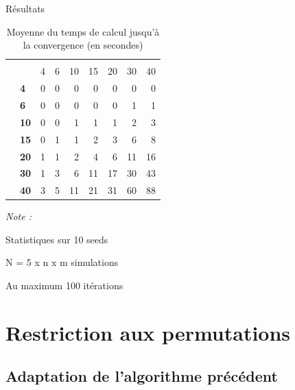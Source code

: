 \documentclass[10pt,xcolor=table,color={dvipsnames,usenames},ignorenonframetext,usepdftitle=false,french]{beamer}
\begin{document}
\begin{frame}{Résultats}
\protect\hypertarget{ruxe9sultats-4}{}

\begin{table}

\caption{\label{tab:tabq1tempsconv}Moyenne du temps de calcul jusqu'à la convergence (en secondes)}
\centering
\begin{threeparttable}
\begin{tabular}[t]{>{\bfseries}l|>{\bfseries}l|r|r|r|r|r|r|r}
\hline
\multicolumn{2}{c|}{ } & \multicolumn{7}{c}{m} \\
\cline{3-9}
  &    & 4 & 6 & 10 & 15 & 20 & 30 & 40\\
\hline
 & 4 & 0 & 0 & 0 & 0 & 0 & 0 & 0\\
\cline{2-9}
 & 6 & 0 & 0 & 0 & 0 & 0 & 1 & 1\\
\cline{2-9}
 & 10 & 0 & 0 & 1 & 1 & 1 & 2 & 3\\
\cline{2-9}
 & 15 & 0 & 1 & 1 & 2 & 3 & 6 & 8\\
\cline{2-9}
 & 20 & 1 & 1 & 2 & 4 & 6 & 11 & 16\\
\cline{2-9}
 & 30 & 1 & 3 & 6 & 11 & 17 & 30 & 43\\
\cline{2-9}
\multirow{-7}{*}{\raggedright\arraybackslash n} & 40 & 3 & 5 & 11 & 21 & 31 & 60 & 88\\
\hline
\end{tabular}
\begin{tablenotes}
\item \textit{Note : } 
\item Statistiques sur 10 seeds
\item N = 5 x n x m simulations
\item Au maximum 100 itérations
\end{tablenotes}
\end{threeparttable}
\end{table}

\end{frame}

\hypertarget{restriction-aux-permutations}{%
\section{Restriction aux
permutations}\label{restriction-aux-permutations}}

\hypertarget{adaptation-de-lalgorithme-pruxe9cuxe9dent}{%
\subsection{Adaptation de l'algorithme
précédent}\label{adaptation-de-lalgorithme-pruxe9cuxe9dent}}
\end{document}
